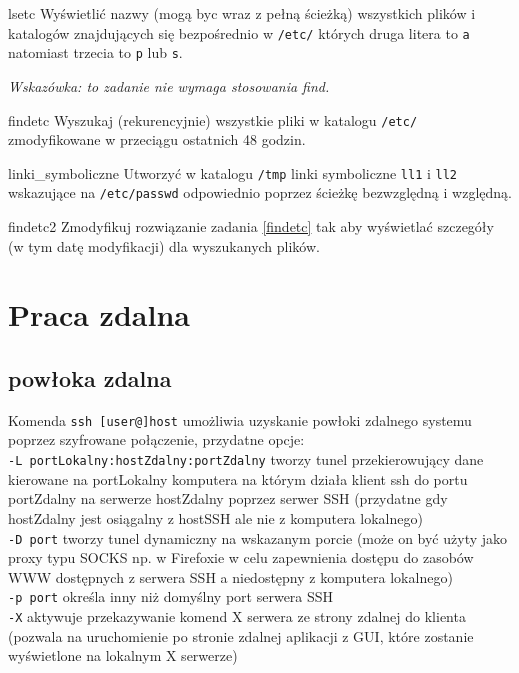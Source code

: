 \documentclass{pdfBooklets}
\begin{document}
\setcounter{subsection}{0} %

\begin{Zadanie}{}{lsetc}
Wyświetlić nazwy (mogą byc wraz z pełną ścieżką) wszystkich plików i katalogów znajdujących się bezpośrednio w \texttt{/etc/} których druga litera to \texttt{a} natomiast trzecia to \texttt{p} lub \texttt{s}.

\emph{Wskazówka: to zadanie nie wymaga stosowania find.}
\end{Zadanie}

\begin{Zadanie}{}{findetc}
Wyszukaj (rekurencyjnie) wszystkie pliki w katalogu \texttt{/etc/} zmodyfikowane w przeciągu ostatnich 48 godzin.
\end{Zadanie}

\begin{Zadanie}{}{linki_symboliczne}
Utworzyć w katalogu \texttt{/tmp} linki symboliczne \texttt{ll1} i \texttt{ll2} wskazujące na \texttt{/etc/passwd} odpowiednio poprzez ścieżkę bezwzględną i względną.
\end{Zadanie}

\begin{Zadanie}{}{findetc2}
Zmodyfikuj rozwiązanie zadania \ref{findetc} tak aby wyświetlać szczegóły (w tym datę modyfikacji) dla wyszukanych plików.
\end{Zadanie}

\section{Praca zdalna}
\subsection{powłoka zdalna}
Komenda
\texttt{ssh [user@]host}
umożliwia uzyskanie powłoki zdalnego systemu poprzez szyfrowane połączenie, przydatne opcje:\\
	\texttt{-L portLokalny:hostZdalny:portZdalny} tworzy tunel przekierowujący dane kierowane na portLokalny komputera na którym działa klient ssh do portu portZdalny na serwerze hostZdalny poprzez serwer SSH (przydatne gdy hostZdalny jest osiągalny z hostSSH ale nie z komputera lokalnego)\\
	\texttt{-D port} tworzy tunel dynamiczny na wskazanym porcie (może on być użyty jako proxy typu SOCKS np. w Firefoxie w celu zapewnienia dostępu do zasobów WWW dostępnych z serwera SSH a niedostępny z komputera lokalnego)\\
	\texttt{-p port} określa inny niż domyślny port serwera SSH\\
	\texttt{-X} aktywuje przekazywanie komend X serwera ze strony zdalnej do klienta (pozwala na uruchomienie po stronie zdalnej aplikacji z GUI, które zostanie wyświetlone na lokalnym X serwerze)
\end{document}
